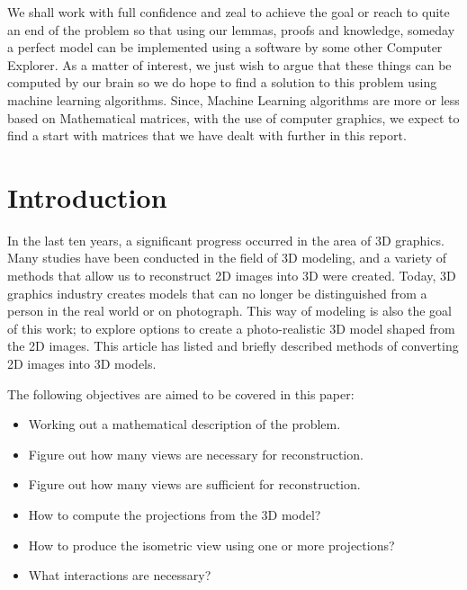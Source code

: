 \documentclass[12pt]{report}
\begin{document}
\vspace{0.2cm}
We shall work with full confidence and zeal to achieve the goal or reach to quite an end of the problem so that using our lemmas, proofs and knowledge, someday a perfect model can be implemented using a software by some other Computer Explorer. As a matter of interest, we just wish to argue that these things can be computed by our brain so we do hope to find a solution to this problem using machine learning algorithms. Since, Machine Learning algorithms are more or less based on Mathematical matrices, with the use of computer graphics, we expect to find a start with matrices that we have dealt with further in this report. 

\newpage

\tableofcontents

\newpage


\chapter{Introduction}

In the last ten years, a significant progress occurred in the area of 3D graphics. Many studies have been conducted in the field of 3D modeling, and a variety of methods that allow us to reconstruct 2D images into 3D were created. Today, 3D graphics industry creates models that can no longer be distinguished from a person in the real world or on photograph. This way of modeling is also the goal of this work; to explore options to create a photo-realistic 3D model shaped from the 2D images. This article has listed and briefly described methods of converting 2D images into 3D models.

\vspace{1cm}

The following objectives are aimed to be covered in this paper:

\begin{itemize}
  \item
  Working out a mathematical description of the problem.
  \item
  Figure out how many views are necessary for reconstruction.
  \item
  Figure out how many views are sufficient for reconstruction.
  \item
  How to compute the projections from the 3D model?
  \item
  How to produce the isometric view using one or more projections?
  \item
  What interactions are necessary?
  
\end{itemize}
\end{document}

